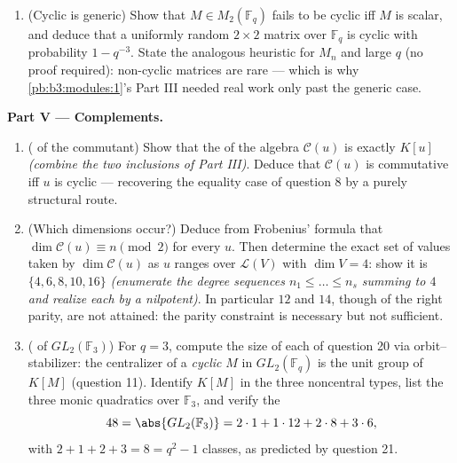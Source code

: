 \begin{problem}
\begin{enumerate}[resume]
        $GL_2(\mathbb F_q)$ has exactly $q^2 - 1$ . \emph{(Count monic  quadratics over
        $\mathbb F_q$; unordered pairs $\{a, b\}$; remember
        invertibility constrains constant terms.)}
  \item (Cyclic is generic) Show that $M \in M_2(\mathbb F_q)$
        fails to be cyclic iff $M$ is scalar, and deduce that a
        uniformly random $2\times2$ matrix over $\mathbb F_q$ is
        cyclic with probability $1 - q^{-3}$. State the analogous
        heuristic for $M_n$ and large $q$ (no proof required):
        non-cyclic matrices are rare --- which is why
        \cref{pb:b3:modules:1}'s Part III needed real work only
        past the generic case.
\end{enumerate}

\medskip
\noindent\textbf{Part V --- Complements.}
\begin{enumerate}[resume]
  \item ( of the commutant) Show that the  of the
        algebra $\mathcal C(u)$ is exactly $K[u]$ \emph{(combine
        the two inclusions of Part III)}. Deduce that
        $\mathcal C(u)$ is commutative iff $u$ is cyclic ---
        recovering the equality case of question 8 by a purely
        structural route.
  \item (Which dimensions occur?) Deduce from Frobenius'
        formula that $\dim\mathcal C(u) \equiv n \pmod 2$ for
        every $u$. Then determine the exact set of values taken
        by $\dim \mathcal C(u)$ as $u$ ranges over
        $\mathcal L(V)$ with $\dim V = 4$: show it is $\{4, 6,
        8, 10, 16\}$ \emph{(enumerate the degree sequences $n_1
        \leq \dots \leq n_s$ summing to $4$ and realize each by
        a nilpotent)}. In particular $12$ and $14$, though of
        the right parity, are not attained: the parity
        constraint is necessary but not sufficient.
  \item ( of $GL_2(\mathbb F_3)$) For $q = 3$,
        compute the size of each  of question 20
        via orbit--stabilizer: the centralizer of a
        \emph{cyclic} $M$ in $GL_2(\mathbb F_q)$ is the unit
        group of $K[M]$ (question 11). Identify $K[M]$ in the
        three noncentral types, list the three monic 
        quadratics over $\mathbb F_3$, and verify the 
        \[
        48 = \abs{GL_2(\mathbb F_3)}
        = 2\cdot1 + 1\cdot12 + 2\cdot8 + 3\cdot6,
        \]
        with $2 + 1 + 2 + 3 = 8 = q^2 - 1$ classes, as
        predicted by question 21.
\end{enumerate}
\end{problem}
